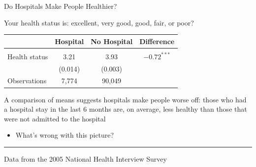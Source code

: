 \documentclass[10pt,xcolor=table,ignorenonframetext,handout,aspectratio=169]{beamer}
\newlength{\wideitemsep}
\let\olditem\item
\renewcommand{\item}{\setlength{\itemsep}{\wideitemsep}\olditem}
\newcommand{\HRule}{\rule{0.5\textwidth}{0.05mm}}
\begin{document}

\begin{frame}{Do Hospitals Make People Healthier?}

\medskip

Your health status is:  excellent, very good, good, fair, or poor?

\medskip
\medskip
\begin{center}
	\begin{tabular}{lccc}
		& \textbf{Hospital}    & \textbf{No Hospital}     & \textbf{Difference} \\ [0.4ex]
		\hline
		& & & \\ [-2ex]
		Health status   & 3.21                      & 3.93                          & $-0.72^{\ast \ast \ast}$ \\ [0.6ex]
		& (0.014)                   & (0.003)                       & \\ [0.6ex]
		Observations    & 7,774                     & 90,049                        & \\ [0.6ex]
		\hline
	\end{tabular}
\end{center}

\medskip
\medskip
A comparison of means suggests hospitals make people worse off:  those who had a hospital stay in the last 6 months are, on average, less healthy than those that were not admitted to the hospital
 
\pause
\medskip
\begin{itemize}
	
	\item What's wrong with this picture?
	
\end{itemize}

\end{frame}

\noindent
\HRule

\medskip
\noindent
Data from the 2005 National Health Interview Survey


\end{document}
